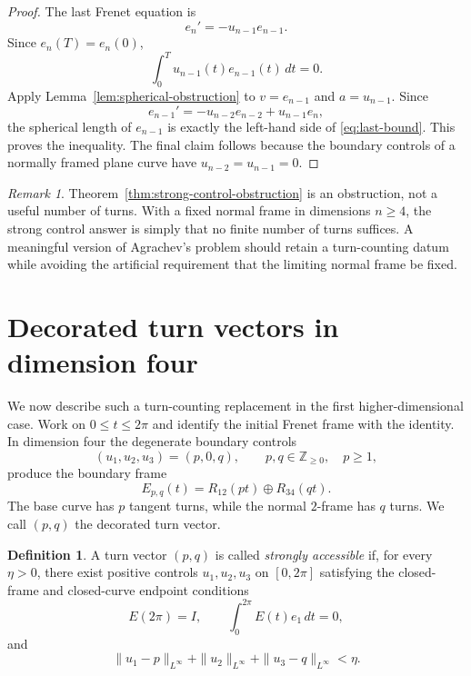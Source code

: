 \documentclass[11pt,reqno]{amsart}
\theoremstyle{definition}
\newtheorem{definition}[theorem]{Definition}
\theoremstyle{remark}
\newtheorem{remark}[theorem]{Remark}
\begin{document}
\begin{proof}
The last Frenet equation is
\[
        e_n'=-u_{n-1}e_{n-1}.
\]
Since $e_n(T)=e_n(0)$,
\[
        \int_0^T u_{n-1}(t)e_{n-1}(t)\,dt=0.
\]
Apply Lemma~\ref{lem:spherical-obstruction} to $v=e_{n-1}$ and $a=u_{n-1}$.  Since
\[
        e_{n-1}'=-u_{n-2}e_{n-2}+u_{n-1}e_n,
\]
the spherical length of $e_{n-1}$ is exactly the left-hand side of
\eqref{eq:last-bound}.  This proves the inequality.  The final claim follows because
the boundary controls of a normally framed plane curve have $u_{n-2}=u_{n-1}=0$.
\end{proof}

\begin{remark}\label{rem:why-not-number}
Theorem~\ref{thm:strong-control-obstruction} is an obstruction, not a useful number
of turns.  With a fixed normal frame in dimensions $n\ge4$, the strong control answer
is simply that no finite number of turns suffices.  A meaningful version of
Agrachev's problem should retain a turn-counting datum while avoiding the artificial
requirement that the limiting normal frame be fixed.
\end{remark}

\section{Decorated turn vectors in dimension four}

We now describe such a turn-counting replacement in the first higher-dimensional
case.  Work on $0\le t\le2\pi$ and identify the initial Frenet frame with the identity.
In dimension four the degenerate boundary controls
\begin{equation}\label{eq:decorated-control}
        (u_1,u_2,u_3)=(p,0,q),
        \qquad p,q\in\mathbb Z_{\ge0},\quad p\ge1,
\end{equation}
produce the boundary frame
\[
        E_{p,q}(t)=R_{12}(pt)\oplus R_{34}(qt).
\]
The base curve has $p$ tangent turns, while the normal $2$-frame has $q$ turns.  We
call $(p,q)$ the decorated turn vector.

\begin{definition}\label{def:accessible-turn-vector}
A turn vector $(p,q)$ is called \emph{strongly accessible} if, for every $\eta>0$,
there exist positive controls $u_1,u_2,u_3$ on $[0,2\pi]$ satisfying the closed-frame
and closed-curve endpoint conditions
\begin{equation}\label{eq:endpoint-conditions}
        E(2\pi)=I,
        \qquad
        \int_0^{2\pi}E(t)e_1\,dt=0,
\end{equation}
and
\[
        \|u_1-p\|_{L^\infty}+\|u_2\|_{L^\infty}+\|u_3-q\|_{L^\infty}<\eta .
\]
\end{definition}
\end{document}
